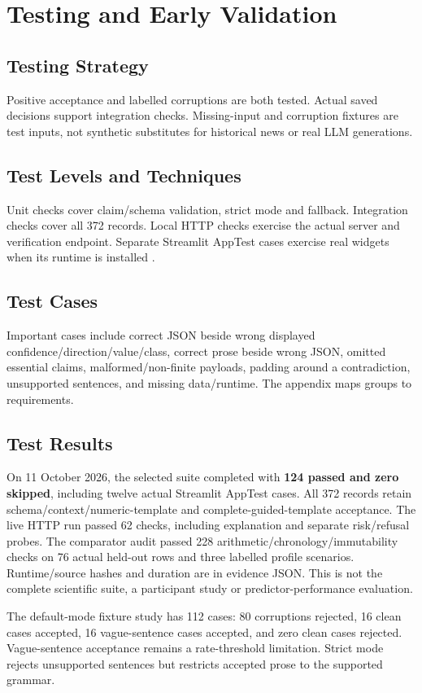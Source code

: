 \chapter{Testing and Early Validation}
\section{Testing Strategy}
Positive acceptance and labelled corruptions are both tested. Actual saved decisions support integration checks. Missing-input and corruption fixtures are test inputs, not synthetic substitutes for historical news or real LLM generations.
\section{Test Levels and Techniques}
Unit checks cover claim/schema validation, strict mode and fallback. Integration checks cover all 372 records. Local HTTP checks exercise the actual server and verification endpoint. Separate Streamlit AppTest cases exercise real widgets when its runtime is installed \cite{streamlit_apptest}.
\section{Test Cases}
Important cases include correct JSON beside wrong displayed confidence/direction/value/class, correct prose beside wrong JSON, omitted essential claims, malformed/non-finite payloads, padding around a contradiction, unsupported sentences, and missing data/runtime. The appendix maps groups to requirements.
\section{Test Results}
On 11 October 2026, the selected suite completed with \textbf{124 passed and zero skipped}, including twelve actual Streamlit AppTest cases. All 372 records retain schema/context/numeric-template and complete-guided-template acceptance. The live HTTP run passed 62 checks, including explanation and separate risk/refusal probes. The comparator audit passed 228 arithmetic/chronology/immutability checks on 76 actual held-out rows and three labelled profile scenarios. Runtime/source hashes and duration are in evidence JSON. This is not the complete scientific suite, a participant study or predictor-performance evaluation.

The default-mode fixture study has 112 cases: 80 corruptions rejected, 16 clean cases accepted, 16 vague-sentence cases accepted, and zero clean cases rejected. Vague-sentence acceptance remains a rate-threshold limitation. Strict mode rejects unsupported sentences but restricts accepted prose to the supported grammar.
